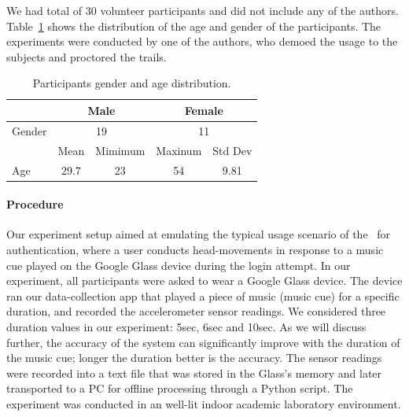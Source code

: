 We had total of 30 volunteer participants and did not include any of the 
authors. Table~\ref{tab:human-subjects-distrib} shows the distribution of the 
age and gender of the participants. The experiments were conducted by one of 
the authors, who demoed the usage to the subjects and proctored the trails.

\begin{table}[h]
\begin{tabular}{lclcl}
\cline{1-5}
       & \multicolumn{2}{c}{Male}                          & \multicolumn{2}{c}{Female}                             \\ \hline\hline
Gender & \multicolumn{2}{c}{19}                            & \multicolumn{2}{c}{11}                                 \\ \hline
       & \multicolumn{1}{l}{Mean} & \multicolumn{1}{l}{Mimimum}                & \multicolumn{1}{l}{Maxinum} & \multicolumn{1}{l}{Std Dev}                  \\ \hline\hline
Age    & \multicolumn{1}{c}{29.7}                     & \multicolumn{1}{c}{23} & \multicolumn{1}{c}{54}                          & \multicolumn{1}{c}{9.81} \\ \hline
\end{tabular}
\label{tab:human-subjects-distrib}
\caption{Participants gender and age distribution.}
\end{table}

\paragraph{Procedure}
Our experiment setup aimed at emulating the typical usage scenario 
of the \systemname~for authentication, where a user conducts head-movements in 
response to a music cue played on the Google Glass device during the login 
attempt.
In our experiment, all participants were asked to wear a Google Glass 
device. The device ran our data-collection app that played a piece of music 
(music cue) for a specific duration, and recorded the accelerometer sensor 
readings. We considered three duration values in our experiment: 5sec, 
6sec and 10sec. As we will discuss further, the accuracy of the system can 
significantly improve with the duration of the music cue; longer the duration 
better is the accuracy. 
The sensor readings were recorded into a text file that was stored 
in the Glass's memory and later transported to a PC for offline processing
through a Python script. The experiment was conducted in an well-lit indoor 
academic laboratory environment. 
 
